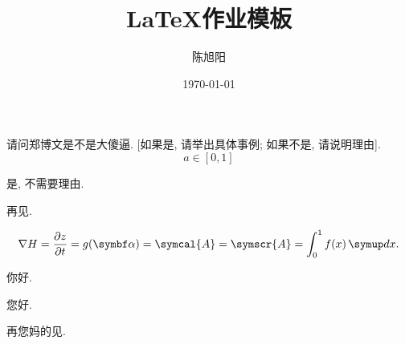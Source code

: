 \documentclass[chinese, lineno, watermark]{assignment}
\title{\LaTeX 作业模板}
\author{陈旭阳}
\date{\today}
\institute{同济大学数学科学学院}
\begin{document}
    \maketitle

    \begin{problem}
        请问郑博文是不是大傻逼. [如果是, 请举出具体事例; 如果不是, 请说明理由].
        \begin{equation}
            a\in[0, 1]
        \end{equation}
    \end{problem}

    \begin{solution}
        是, 不需要理由.

        再见.

        \begin{equation}
            \nabla{H}=\frac{\partial{z}}{\partial{t}}=g(\vect{\alpha}) = \symcal{A} = \symscr{A} = \int_{0}^{1}f(x)\diff x.
        \end{equation}

        你好.

    \end{solution}

    \clearpage

    您好.

    再您妈的见.
\end{document}
